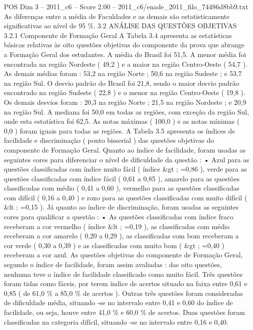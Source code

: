 \begin{textsample}{POS Dim 3 – 2011\_c6 – Score 2.00 – 2011\_c6/enade\_2011\_filo\_74486d8bb9.txt}
As diferenças entre a média de Faculdades e as demais são estatisticamente significativas ao nível de 95 \%. 3.2 ANÁLISE DAS QUESTÕES OBJETIVAS 3.2.1 Componente de Formação Geral A Tabela 3.4 apresenta as estatísticas básicas relativas às oito questões objetivas do componente da prova que abrange a Formação Geral dos estudantes.
A média do Brasil foi 51,5.
A menor média foi encontrada na região Nordeste ( 49,2 ) e a maior na região Centro-Oeste ( 54,7 ).
As demais médias foram : 53,2 na região Norte ; 50,6 na região Sudeste ; e 53,7 na região Sul.
O desvio padrão do Brasil foi 21,8, sendo o maior desvio padrão encontrado na região Sudeste ( 22,8 ) e o menor na região Centro-Oeste ( 19,8 ).
Os demais desvios foram : 20,3 na região Norte ; 21,5 na região Nordeste ; e 20,9 na região Sul.
A mediana foi 50,0 em todas as regiões, com exceção da região Sul, onde esta estatística foi 62,5.
As notas máximas ( 100,0 ) e as notas mínimas ( 0,0 ) foram iguais para todas as regiões.
A Tabela 3.5 apresenta os índices de facilidade e discriminação ( ponto bisserial ) das questões objetivas do componente de Formação Geral.
Quanto ao índice de facilidade, foram usadas as seguintes cores para diferenciar o nível de dificuldade da questão : • Azul para as questões classificadas com índice muito fácil ( índice \&gt ; =0,86 ), verde para as questões classificadas com índice fácil ( 0,61 a 0,85 ), amarelo para as questões classificadas com médio ( 0,41 a 0,60 ), vermelho para as questões classificadas com difícil ( 0,16 a 0,40 ) e roxo para as questões classificadas com muito difícil ( \&lt ; =0,15 ).
Já quanto ao índice de discriminação, foram usadas as seguintes cores para qualificar a questão : • As questões classificadas com índice fraco receberam a cor vermelho ( índice \&lt ; =0,19 ), as classificadas com médio receberam a cor amarelo ( 0,20 a 0,29 ), as classificadas com bom receberam a cor verde ( 0,30 a 0,39 ) e as classificadas com muito bom ( \&gt ; =0,40 ) receberam a cor azul.
As questões objetivas do componente de Formação Geral, segundo o índice de facilidade, foram assim avaliadas : das oito questões, nenhuma teve o índice de facilidade classificado como muito fácil.
Três questões foram tidas como fáceis, por terem índice de acertos situado na faixa entre 0,61 e 0,85 ( de 61,0 \% a 85,0 \% de acertos ).
Outras três questões foram consideradas de dificuldade média, situando -se no intervalo entre 0,41 e 0,60 do índice de facilidade, ou seja, houve entre 41,0 \% e 60,0 \% de acertos.
Duas questões foram classificadas na categoria difícil, situando -se no intervalo entre 0,16 e 0,40.

\end{textsample}
